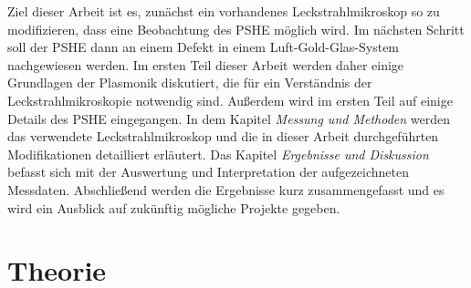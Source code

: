 \documentclass[titlepage]{article}
\begin{document}
	Ziel dieser Arbeit ist es, zunächst ein vorhandenes Leckstrahlmikroskop so zu modifizieren, dass eine Beobachtung des PSHE möglich wird. Im nächsten Schritt soll der PSHE dann an einem Defekt in einem Luft-Gold-Glas-System nachgewiesen werden. Im ersten Teil dieser Arbeit werden daher einige Grundlagen der Plasmonik diskutiert, die für ein Verständnis der Leckstrahlmikroskopie notwendig sind. Außerdem wird im ersten Teil auf einige Details des PSHE eingegangen. In dem Kapitel \textit{Messung und Methoden} werden das verwendete Leckstrahlmikroskop und die in dieser Arbeit durchgeführten Modifikationen detailliert erläutert. Das Kapitel \textit{Ergebnisse und Diskussion} befasst sich mit der Auswertung und Interpretation der aufgezeichneten Messdaten. Abschließend werden die Ergebnisse kurz zusammengefasst und es wird ein Ausblick auf zukünftig mögliche Projekte gegeben.  
	
	\section{Theorie}
\end{document}
